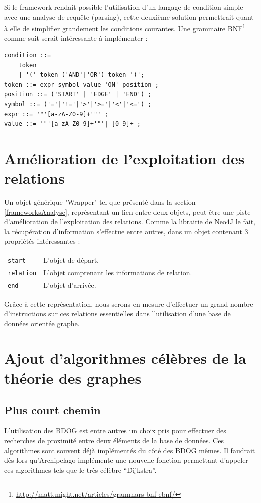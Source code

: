 \documentclass[a4paper,fleqn,12pt,oneside]{book}
\begin{document}
Si le framework rendait possible l'utilisation d'un langage de condition simple avec une analyse de requête (parsing), cette deuxième solution permettrait quant à elle de simplifier grandement les conditions courantes. Une grammaire BNF\footnote{\url{http://matt.might.net/articles/grammars-bnf-ebnf/}} comme suit serait intéressante à implémenter :

\begin{lstlisting}
condition ::=
	token
	| '(' token ('AND'|'OR') token ')';
token ::= expr symbol value 'ON' position ;
position ::= ('START' | 'EDGE' | 'END') ;
symbol ::= ('='|'!='|'>'|'>='|'<'|'<=') ;
expr ::= '"'[a-zA-Z0-9]+'"' ;
value ::= '"'[a-zA-Z0-9]+'"'| [0-9]+ ;
\end{lstlisting}

\section{Amélioration de l'exploitation des relations}

Un objet générique "Wrapper" tel que présenté dans la section \ref{frameworksAnalyse}, représentant un lien entre deux objets, peut être une piste d'amélioration de l'exploitation des relations. Comme la librairie de Neo4J le fait, la récupération d'information s'effectue entre autres, dans un objet contenant 3 propriétés intéressantes :

\begin{tabular}[c]{l M{12cm}}
\texttt{start} & L'objet de départ.  \tabularnewline
\texttt{relation} & L'objet comprenant les informations de relation.  \tabularnewline
\texttt{end} & L'objet d'arrivée.  \tabularnewline
\end{tabular}

Grâce à cette représentation, nous serons en mesure d'effectuer un grand nombre d'instructions sur ces relations essentielles dans l'utilisation d'une base de données orientée graphe.

\section{Ajout d'algorithmes célèbres de la théorie des graphes}

\subsection*{Plus court chemin}

L'utilisation des BDOG est entre autres un choix pris pour effectuer des recherches de proximité entre deux éléments de la base de données. Ces algorithmes sont souvent déjà implémentés du côté des BDOG mêmes. Il faudrait dès lors qu'Archipelago implémente une nouvelle fonction permettant d'appeler ces algorithmes tels que le très célèbre \enquote{Dijkstra}\cite{dijkstra1959note}. 
\end{document}
